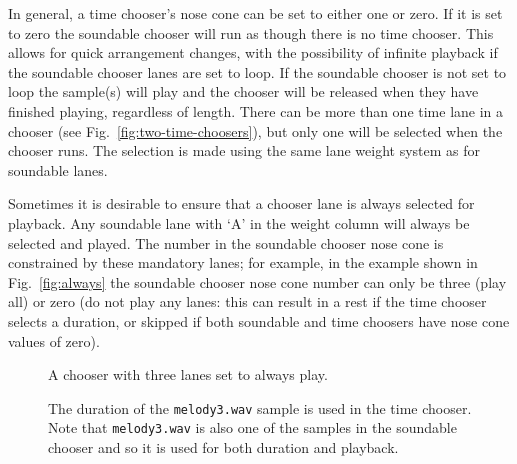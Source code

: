 \documentclass[runningheads,a4paper]{llncs}
\begin{document}
In general, a time chooser's nose cone can be set to either one or zero. If it is set to zero the soundable chooser will run as though there is no time chooser. This allows for quick arrangement changes, with the possibility of infinite playback if the soundable chooser lanes are set to loop. If the soundable chooser is not set to loop the sample(s) will play and the chooser will be released when they have finished playing, regardless of length.
There can be more than one time lane in a chooser (see Fig.~\ref{fig:two-time-choosers}), but only one will be selected when the chooser runs. The selection is made using the same lane weight system as for soundable lanes.

Sometimes it is desirable to ensure that a chooser lane is always selected for playback. Any soundable lane with `A' in the weight column will always be selected and played. The number in the soundable chooser nose cone is constrained by these mandatory lanes; for example, in the example shown in Fig.~\ref{fig:always} the soundable chooser nose cone number can only be three (play all) or zero (do not play any lanes: this can result in a rest if the time chooser selects a duration, or skipped if both soundable and time choosers have nose cone values of zero).


\begin{figure}[!h]
	\begin{floatrow}
	{\caption{A chooser with three lanes set to always play.}\label{fig:always}}
	{\caption{The duration of the \texttt{melody3.wav} sample is used in the
		time chooser. Note that \texttt{melody3.wav} is also one of the samples
		in the soundable chooser and so it is used for both duration and
		playback.}\label{fig:sample-time}}
	\end{floatrow}
\end{figure}
\end{document}
